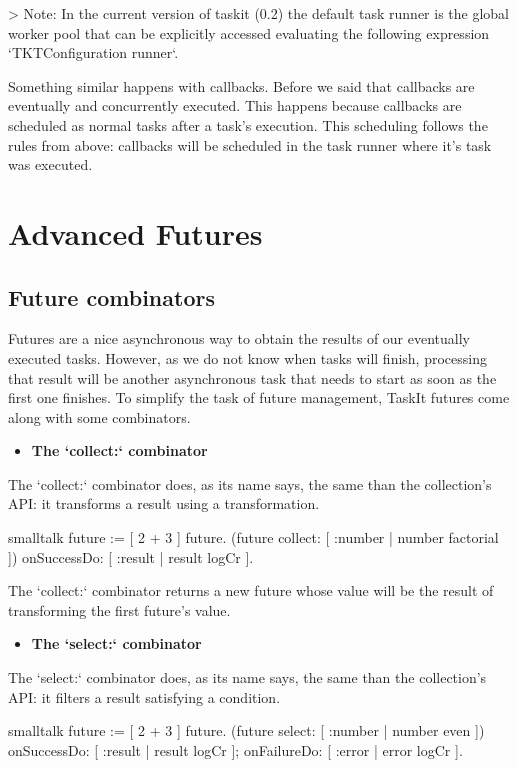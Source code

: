 \documentclass[10pt,twoside,english]{_support/latex/sbabook/sbabook}
\begin{document}
\textgreater{} Note: In the current version of taskit (0.2) the default task runner is the global worker pool that can be explicitly accessed evaluating the following expression `TKTConfiguration runner`.

Something similar happens with callbacks. Before we said that callbacks are eventually and concurrently executed. This happens because callbacks are scheduled as normal tasks after a task's execution. This scheduling follows the rules from above: callbacks will be scheduled in the task runner where it's task was executed.
\chapter{Advanced Futures}\section{Future combinators}
Futures are a nice asynchronous way to obtain the results of our eventually executed tasks. However, as we do not know when tasks will finish, processing that result will be another asynchronous task that needs to start as soon as the first one finishes. To simplify the task of future management, TaskIt futures come along with some combinators.

\begin{itemize}
\item \textbf{The `collect:` combinator}
\end{itemize}

The `collect:` combinator does, as its name says, the same than the collection's API: it transforms a result using a transformation.

\begin{displaycode}{smalltalk}
future := [ 2 + 3 ] future.
(future collect: [ :number | number factorial ])
    onSuccessDo: [ :result | result logCr ].
\end{displaycode}

The `collect:` combinator returns a new future whose value will be the result of transforming the first future's value.

\begin{itemize}
\item \textbf{The `select:` combinator}
\end{itemize}

The `select:` combinator does, as its name says, the same than the collection's API: it filters a result satisfying a condition.

\begin{displaycode}{smalltalk}
future := [ 2 + 3 ] future.
(future select: [ :number | number even ])
    onSuccessDo: [ :result | result logCr ];
    onFailureDo: [ :error | error logCr ].
\end{displaycode}
\end{document}
